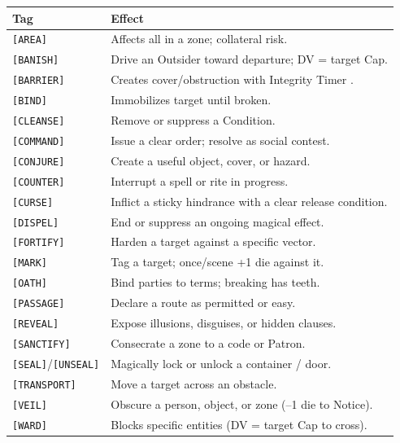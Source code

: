 \begin{tabular}{@{}l>{\raggedright\arraybackslash}p{9cm}@{}}
\toprule
\textbf{Tag} & \textbf{Effect} \\
\midrule
\texttt{[AREA]} & Affects all in a zone; collateral risk. \\
\texttt{[BANISH]} & Drive an Outsider toward departure; DV = target Cap. \\
\texttt{[BARRIER]} & Creates cover/obstruction with Integrity Timer . \\
\texttt{[BIND]} & Immobilizes target until broken. \\
\texttt{[CLEANSE]} & Remove or suppress a Condition. \\
\texttt{[COMMAND]} & Issue a clear order; resolve as social contest. \\
\texttt{[CONJURE]} & Create a useful object, cover, or hazard. \\
\texttt{[COUNTER]} & Interrupt a spell or rite in progress. \\
\texttt{[CURSE]} & Inflict a sticky hindrance with a clear release condition. \\
\texttt{[DISPEL]} & End or suppress an ongoing magical effect. \\
\texttt{[FORTIFY]} & Harden a target against a specific vector. \\
\texttt{[MARK]} & Tag a target; once/scene +1 die against it. \\
\texttt{[OATH]} & Bind parties to terms; breaking has teeth. \\
\texttt{[PASSAGE]} & Declare a route as permitted or easy. \\
\texttt{[REVEAL]} & Expose illusions, disguises, or hidden clauses. \\
\texttt{[SANCTIFY]} & Consecrate a zone to a code or Patron. \\
\texttt{[SEAL]}/\texttt{[UNSEAL]} & Magically lock or unlock a container / door. \\
\texttt{[TRANSPORT]} & Move a target across an obstacle. \\
\texttt{[VEIL]} & Obscure a person, object, or zone (--1 die to Notice). \\
\texttt{[WARD]} & Blocks specific entities (DV = target Cap to cross). \\
\bottomrule
\end{tabular}

